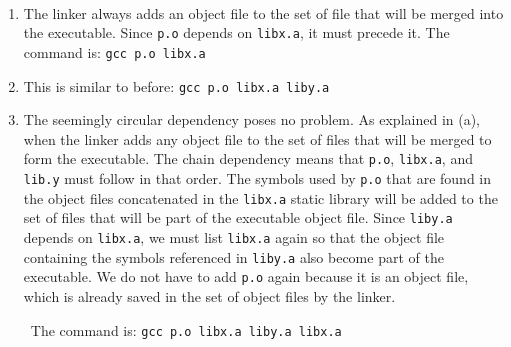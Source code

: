 \documentclass[12pt]{article}
\newenvironment{sol}[1][Solution]{\begin{trivlist}
		\item[\hskip \labelsep {\bfseries #1:}]}{\end{trivlist}}
\begin{document}
\begin{sol}
	\
	\begin{enumerate}[label=(\alph*)]
		\item The linker always adds an object file to the set of file that will be merged into
		the executable. Since \texttt{p.o} depends on \texttt{libx.a}, it must precede it. The
		command is: \texttt{gcc p.o libx.a}
		\item This is similar to before: \texttt{gcc p.o libx.a liby.a}
		\item The seemingly circular dependency poses no problem. As explained in (a), when the
		linker adds any object file to the set of files that will be merged to form the executable.
		The chain dependency means that \texttt{p.o}, \texttt{libx.a}, and \texttt{lib.y} must follow
		in that order. The symbols used by \texttt{p.o} that are found in the object files concatenated
		in the \texttt{libx.a} static library will be added to the set of files that will be part of
		the executable object file. Since \texttt{liby.a} depends on \texttt{libx.a}, we must list
		\texttt{libx.a} again so that the object file containing the symbols referenced in \texttt{liby.a}
		also become part of the executable. We do not have to add \texttt{p.o} again because it is
		an object file, which is already saved in the set of object files by the linker.
		
		\
		The command is: \texttt{gcc p.o libx.a liby.a libx.a}
	\end{enumerate}
\end{sol}
\end{document}
